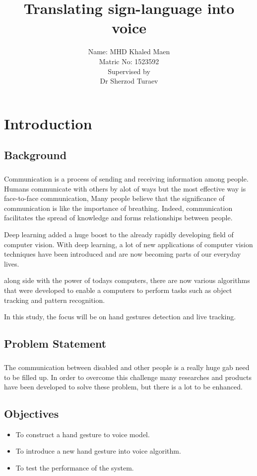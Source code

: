 \documentclass[12pt]{report}
\title{Translating sign-language into voice}
\author{ Name: MHD Khaled Maen\\
        Matric No: 1523592 \\ 
        [1.5cm]
        Supervised by\\
        Dr Sherzod Turaev\\}
\begin{document}
    \maketitle
    \setcounter{page}{2}                    
    \tableofcontents
    \newpage
    \chapter{Introduction} 
        \section{Background}
        \paragraph{}
        Communication is a process of sending and receiving information among people. 
        Humans communicate with others by alot of ways but the most effective way is  face-to-face communication, 
        Many people believe that the significance of communication is like the importance of breathing. 
        Indeed, communication facilitates the spread of knowledge and forms relationships between people.
    
        Deep learning added a huge boost to the already rapidly developing field of computer vision.
        With deep learning, a lot of new applications of computer vision techniques have been introduced and are now becoming parts of our everyday lives.
    
        along side with  the power of todays computers, there are now various algorithms that were developed to enable a
        computers to perform tasks such as object tracking and pattern recognition. 
        
        In this study, the focus will be on hand gestures detection and live tracking. 
        \section{Problem Statement}
        \paragraph{}
        The communication between disabled and other people is
        a really huge gab need to be filled up.
        In order to overcome this challenge many researches and products have been developed to solve these problem, 
        but there is a lot to be enhanced.
        
        \section{Objectives}
        \begin{itemize}
            \item To construct a hand gesture to voice model.
            \item To introduce a new hand gesture into voice algorithm.
            \item To test the performance of the system.
        \end{itemize}    
    
    
\end{document}
